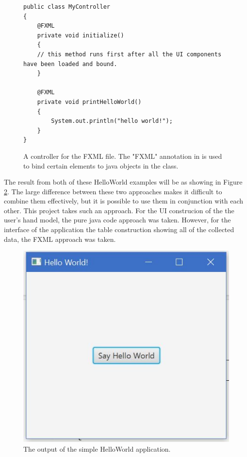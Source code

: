 \begin{figure}[th]
\centering
\begin{lstlisting}
public class MyController 
{
	@FXML
	private void initialize() 
	{
	// this method runs first after all the UI components have been loaded and bound.
	}
	
	@FXML
	private void printHelloWorld() 
	{
		System.out.println("hello world!");
	}
}
\end{lstlisting}
\caption{A controller for the FXML file. The "FXML" annotation in is used to bind certain elements to java objects in the class.}
\label{fig:simpleController}
\end{figure}

The result from both of these HelloWorld examples will be as showing in Figure \ref{fig:helloWorldResult}. The large difference between these two approaches makes it difficult to combine them effectively, but it is possible to use them in conjunction with each other. This project takes such an approach. For the UI construcion of the the user's hand model, the pure java code approach was taken. However, for the interface of the application the table construction showing all of the collected data, the FXML approach was taken. 

\begin{figure}[th]
\centering
\includegraphics[scale=0.5]{Figures/helloWorldResult.JPG}
\caption{The output of the simple HelloWorld application.}
\label{fig:helloWorldResult}
\end{figure}


